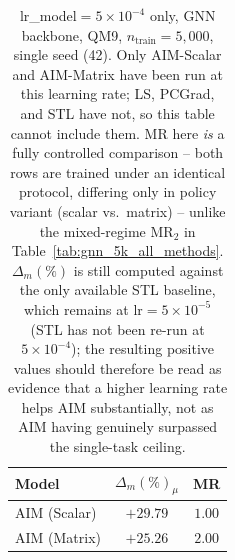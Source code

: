 \begin{table}[t]
\centering
\caption{lr\_model$=5\times10^{-4}$ only, GNN backbone, QM9, $n_{\text{train}}=5{,}000$,
single seed (42). Only AIM-Scalar and AIM-Matrix have been run at this learning
rate; LS, PCGrad, and STL have not, so this table cannot include them. MR here
\emph{is} a fully controlled comparison -- both rows are trained under an
identical protocol, differing only in policy variant (scalar vs.\ matrix) --
unlike the mixed-regime MR$_2$ in Table~\ref{tab:gnn_5k_all_methods}.
$\Delta_m(\%)$ is still computed against the only available STL baseline, which
remains at lr$=5\times10^{-5}$ (STL has not been re-run at $5\times10^{-4}$);
the resulting positive values should therefore be read as evidence that a
higher learning rate helps AIM substantially, not as AIM having genuinely
surpassed the single-task ceiling.}
\label{tab:gnn_5k_lr5e4_only}
\begin{tabular}{lcc}
\toprule
Model & $\Delta_m(\%)_{\mu}$ & MR \\
\midrule
AIM (Scalar) & $\mathbf{+29.79}$ & $\mathbf{1.00}$ \\
AIM (Matrix) & $+25.26$          & $2.00$ \\
\bottomrule
\end{tabular}
\end{table}
